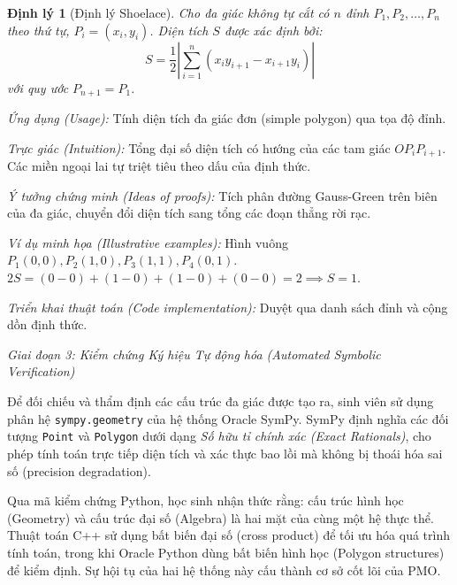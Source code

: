 \documentclass{article}
\newtheorem{dinhly}{Định lý}
\begin{document}
\begin{dinhly}[Định lý Shoelace]
Cho đa giác không tự cắt có $n$ đỉnh $P_1, P_2, \dots, P_n$ theo thứ tự, $P_i = (x_i, y_i)$. Diện tích $S$ được xác định bởi:
\begin{equation*}
 S = \frac{1}{2} \left| \sum_{i=1}^{n} (x_i y_{i+1} - x_{i+1} y_i) \right|
\end{equation*}
với quy ước $P_{n+1} = P_1$.
\end{dinhly}

\emph{Ứng dụng (Usage):} Tính diện tích đa giác đơn (simple polygon) qua tọa độ đỉnh.

\emph{Trực giác (Intuition):} Tổng đại số diện tích có hướng của các tam giác $OP_i P_{i+1}$. Các miền ngoại lai tự triệt tiêu theo dấu của định thức.

\emph{Ý tưởng chứng minh (Ideas of proofs):} Tích phân đường Gauss-Green trên biên của đa giác, chuyển đổi diện tích sang tổng các đoạn thẳng rời rạc.

\emph{Ví dụ minh họa (Illustrative examples):} Hình vuông $P_1(0,0), P_2(1,0), P_3(1,1), P_4(0,1)$. $2S = (0-0) + (1-0) + (1-0) + (0-0) = 2 \implies S = 1$.

\emph{Triển khai thuật toán (Code implementation):}
Duyệt qua danh sách đỉnh và cộng dồn định thức.


\vspace{0.5em}\noindent\emph{Giai đoạn 3: Kiểm chứng Ký hiệu Tự động hóa (Automated Symbolic Verification)}

Để đối chiếu và thẩm định các cấu trúc đa giác được tạo ra, sinh viên sử dụng phân hệ \texttt{sympy.geometry} của hệ thống Oracle \textsf{SymPy}. \textsf{SymPy} định nghĩa các đối tượng \texttt{Point} và \texttt{Polygon} dưới dạng \textit{Số hữu tỉ chính xác (Exact Rationals)}, cho phép tính toán trực tiếp diện tích và xác thực bao lồi mà không bị thoái hóa sai số (precision degradation).

Qua mã kiểm chứng Python, học sinh nhận thức rằng: cấu trúc hình học (Geometry) và cấu trúc đại số (Algebra) là hai mặt của cùng một hệ thực thể. Thuật toán C++ sử dụng bất biến đại số (cross product) để tối ưu hóa quá trình tính toán, trong khi Oracle Python dùng bất biến hình học (Polygon structures) để kiểm định. Sự hội tụ của hai hệ thống này cấu thành cơ sở cốt lõi của PMO.
\end{document}
